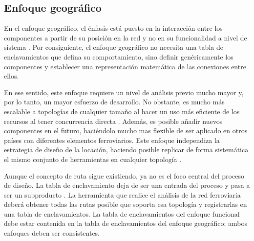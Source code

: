 \subsection{Enfoque geográfico}

    En el enfoque geográfico, el énfasis está puesto en la interacción entre los componentes a partir de su posición en la red y no en su funcionalidad a nivel de sistema \cite{Paper_101,Paper_102,Paper_103}. Por consiguiente, el enfoque geográfico no necesita una tabla de enclavamientos que defina su comportamiento, sino definir genéricamente los componentes y establecer una representación matemática de las conexiones entre ellos. 
    
    En ese sentido, este enfoque requiere un nivel de análisis previo mucho mayor y, por lo tanto, un mayor esfuerzo de desarrollo. No obstante, es mucho más escalable a topologías de cualquier tamaño al hacer un uso más eficiente de los recursos al tener concurrencia directa \cite{Paper_99,Paper_146,Paper_168}. Además, es posible añadir nuevos componentes en el futuro, haciéndolo mucho mas flexible de ser aplicado en otros países con diferentes elementos ferroviarios. Este enfoque independiza la estrategia de diseño de la locación, haciendo posible replicar de forma sistemática el mismo conjunto de herramientas en cualquier topología \cite{Paper_180,Paper_182,Paper_200}.

    Aunque el concepto de ruta sigue existiendo, ya no es el foco central del proceso de diseño. La tabla de enclavamiento deja de ser una entrada del proceso y pasa a ser un subproducto \cite{Paper_200}. La herramienta que realice el análisis de la red ferroviaria deberá obtener todas las rutas posible que soporta esa topología y registrarlas en una tabla de enclavamientos. La tabla de enclavamientos del enfoque funcional debe estar contenida en la tabla de enclavamientos del enfoque geográfico; ambos enfoques deben ser consistentes.